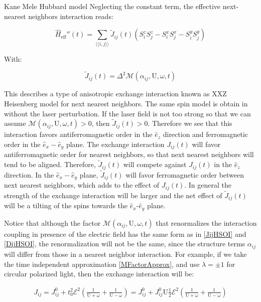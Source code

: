\begin{section}{Kane Mele Hubbard model}
Neglecting the constant term, the effective next-nearest neighbors interaction reads:

\begin{equation}
\hat{H}_{\text{eff}}''(t) = \sum_{\langle \langle i,j \rangle \rangle} \tilde{J}_{ij}(t) (S_i^zS_j^z - S_i^xS_j^x - S_i^yS_j^y)
\end{equation}

With:

\begin{equation}
\tilde{J}_{ij}(t) = \Delta^2 \mathcal{M}(\alpha_{ij}, \text{U}, \omega, t)
\end{equation}

This describes a type of anisotropic exchange interaction known as XXZ Heisenberg model for next nearest neighbors. The same spin model is obtain in \cite{Rachel2010} without the laser perturbation. If the laser field is not too strong so that we can assume $\mathcal{M}(\alpha_{ij}, \text{U}, \omega, t) > 0$, then $\tilde{J}_{ij}(t) > 0$. Therefore we see that this interaction favors antiferromagnetic order in the $\hat{e}_z$ direction and ferromagnetic order in the $\hat{e}_x-\hat{e}_y$ plane. The exchange interaction $J_{ij}(t)$ will favor antiferromagnetic order for nearest neighbors, so that next nearest neighbors will tend to be aligned. Therefore, $\tilde{J}_{ij}(t)$ will compete against $J_{ij}(t)$ in the $\hat{e}_z$ direction. In the $\hat{e}_x-\hat{e}_y$ plane, $\tilde{J}_{ij}(t)$ will favor ferromagnetic order between next nearest neighbors, which adds to the effect of $J_{ij}(t)$. In general the strength of the exchange interaction will be larger and the net effect of $\tilde{J}_{ij}(t)$ will be a tilting of the spins towards the $\hat{e}_x$-$\hat{e}_y$ plane.

Notice that although the factor $\mathcal{M}(\alpha_{ij}, \text{U}, \omega, t)$ that renormalizes the interaction coupling in presence of the electric field has the same form as in \ref{JijHSOI} and \ref{DijHSOI}, the renormalization will not be the same, since the structure terms $\alpha_{ij}$ will differ from those in a nearest neighbor interaction. For example, if we take the time independent approximation \ref{MFactorApprox}, and use $\lambda = \pm 1$ for circular polarized light, then the exchange interaction will be:

\begin{align*}
J_{ij} = J_{ij}^0 + t_0^2 \mathcal{E}^2 \left( \frac{1}{\text{U}+\omega} + \frac{1}{\text{U}-\omega} \right) = J_{ij}^0 + J_{ij}^0 \text{U}\frac{1}{2} \mathcal{E}^2 \left( \frac{1}{\text{U}+\omega} + \frac{1}{\text{U}-\omega} \right)
\end{align*}


\end{section}
